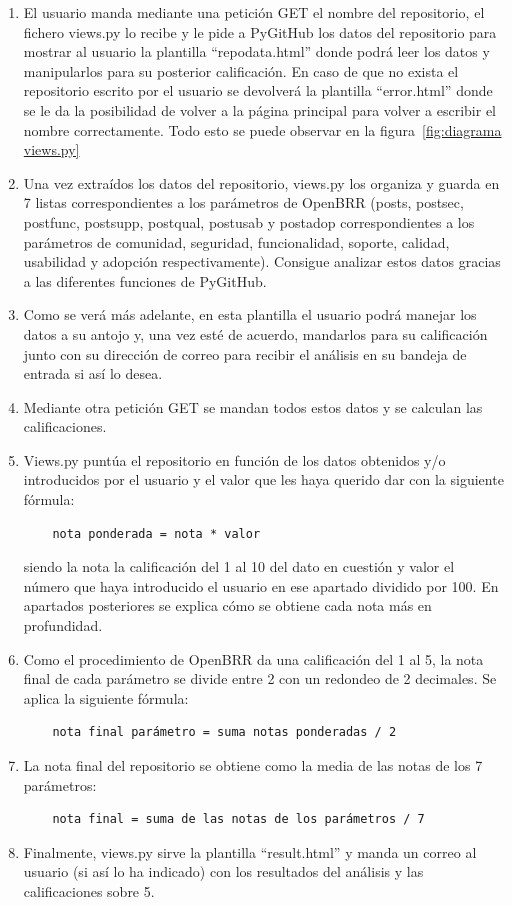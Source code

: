 \documentclass[a4paper, 12pt]{book}
\begin{document}
\begin{enumerate}
	\item El usuario manda mediante una petición GET el nombre del repositorio, el fichero views.py lo recibe y le pide a PyGitHub los datos del repositorio para mostrar al usuario la plantilla ``repo\textunderscore data.html'' donde podrá leer los datos y manipularlos para su posterior calificación. En caso de que no exista el repositorio escrito por el usuario se devolverá la plantilla ``error.html'' donde se le da la posibilidad de volver a la página principal para volver a escribir el nombre correctamente. Todo esto se puede observar en la figura~\ref{fig:diagrama views.py}
	\item Una vez extraídos los datos del repositorio, views.py los organiza y guarda en 7 listas correspondientes a los parámetros de OpenBRR (posts, post\textunderscore sec, post\textunderscore func, post\textunderscore supp, post\textunderscore qual, post\textunderscore usab y post\textunderscore adop correspondientes a los parámetros de comunidad, seguridad, funcionalidad, soporte, calidad, usabilidad y adopción respectivamente). Consigue analizar estos datos gracias a las diferentes funciones de PyGitHub.
	\item Como se verá más adelante, en esta plantilla el usuario podrá manejar los datos a su antojo y, una vez esté de acuerdo, mandarlos para su calificación junto con su dirección de correo para recibir el análisis en su bandeja de entrada si así lo desea.
	\item Mediante otra petición GET se mandan todos estos datos y se calculan las calificaciones.
	\item Views.py puntúa el repositorio en función de los datos obtenidos y/o introducidos por el usuario y el valor que les haya querido dar con la siguiente fórmula: \begin{verbatim}
	nota ponderada = nota * valor
	\end{verbatim}
	siendo la nota la calificación del 1 al 10 del dato en cuestión y valor el número que haya introducido el usuario en ese apartado dividido por 100. En apartados posteriores se explica cómo se obtiene cada nota más en profundidad.
	\item Como el procedimiento de OpenBRR da una calificación del 1 al 5, la nota final de cada parámetro se divide entre 2 con un redondeo de 2 decimales. Se aplica la siguiente fórmula:
	\begin{verbatim}
	nota final parámetro = suma notas ponderadas / 2
	\end{verbatim}
	\item La nota final del repositorio se obtiene como la media de las notas de los 7 parámetros:
	\begin{verbatim}
	nota final = suma de las notas de los parámetros / 7
	\end{verbatim}
	\item Finalmente, views.py sirve la plantilla ``result.html'' y manda un correo al usuario (si así lo ha indicado) con los resultados del análisis y las calificaciones sobre 5.
\end{enumerate}
\end{document}
